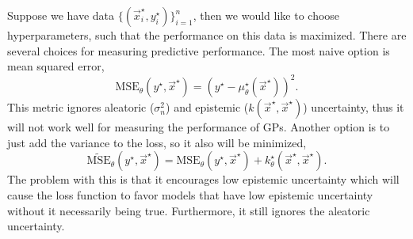 Suppose we have data $\{(\vec{x}_i^\star,y_i^\star)\}_{i=1}^n$, then we would
like to choose hyperparameters, such that the performance on this data is
maximized. There are several choices for measuring predictive performance.
The most naive option is mean squared error, \[
  \text{MSE}_{\theta}(y^\star,\vec{x}^\star) = (y^\star - \mu_{\theta}^\star(\vec{x}^\star))^2.
\]
This metric ignores aleatoric ($\sigma_n^2$) and epistemic
($k(\vec{x}^\star,\vec{x}^\star)$) uncertainty, thus it will not work well for
measuring the performance of GPs. Another option is to just add the variance
to the loss, so it also will be minimized, \[
  \tilde{\text{MSE}}_{\theta}(y^\star,\vec{x}^\star) = \text{MSE}_{\theta}(y^\star,\vec{x}^\star) + k_{\theta}^\star(\vec{x}^\star,\vec{x}^\star).
\]
The problem with this is that it encourages low epistemic uncertainty which
will cause the loss function to favor models that have low epistemic
uncertainty without it necessarily being true. Furthermore, it still ignores
the aleatoric uncertainty.

